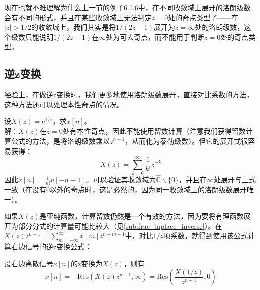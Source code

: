 现在也就不难理解为什么上一节的例子6.1.6中，在不同收敛域上展开的洛朗级数会有不同的形式，并且在某些收敛域上无法判定$z=0$处的奇点类型了——在$|z|>1/2$的收敛域上，我们其实是将$1/(2z-1)$展开为$z=\infty$处的洛朗级数，这个级数只能说明$1/(2z-1)$在$\infty$处为可去奇点，而不能用于判断$z=0$处的奇点类型。

\subsection{逆z变换}\label{sub:z_inverse}
经验上，在做逆z变换时，我们更多地使用洛朗级数展开，直接对比系数的方法，这种方法还可以处理本性奇点的情况。
\begin{example}
    设$X(z)=\mathrm{e}^{1/z}$，求$x[n]$。\\
    解：$X(z)$在$z=0$处有本性奇点，因此不能使用留数计算（注意我们获得留数计算公式的方法，是将洛朗级数乘以$z^{n-1}$，从而化为泰勒级数）。但它的展开式很容易获得：
    \[X(z)=\sum_{k=0}^{\infty}\frac{1}{k!}z^{-k}\]
    因此$x[n]=\frac{1}{n!}u[-n-1]$。可以验证其收敛域为$\hat{\mathbb{C}}\backslash\{0\}$，并且在$\infty$处展开与上式一致（在没有$0$以外的奇点时，这是必然的，因为同一收敛域上的洛朗级数展开唯一）。
\end{example}

如果$X(z)$是亚纯函数，计算留数仍然是一个有效的方法，因为要将有理函数展开为部分分式的计算量可能比较大（见\ref{sub:frac_laplace_inverse}）。在$X(z)z^{n-1}=\sum_{m=-\infty}^{\infty}x[m]z^{n-m-1}$中，对比$1/z$项系数，就得到使用该公式计算右边信号的逆z变换公式：
\begin{claim}
    设右边离散信号$x[n]$的z变换为$X(z)$，则有
    \[x[n]=-\text{Res}\left(X(z)z^{n-1},\infty\right)=\text{Res}\left(\frac{X(1/z)}{z^{n+1}},0\right)\]
\end{claim}

